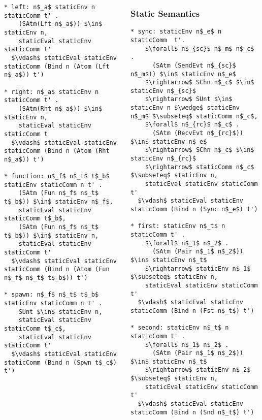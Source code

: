\documentclass{beamer}
\begin{document}
\begin{frame}[fragile]
\begin{columns}
\begin{frame}[fragile]
\begin{lstlisting}[language=logic, mathescape]
* left: n$_a$ staticEnv n staticComm t' .
    (SAtm(Lft n$_a$)) $\in$ staticEnv n,
    staticEval staticEnv staticComm t' 
  $\vdash$ staticEval staticEnv staticComm (Bind n (Atom (Lft n$_a$)) t')

* right: n$_a$ staticEnv n staticComm t' .
    (SAtm(Rht n$_a$)) $\in$ staticEnv n, 
    staticEval staticEnv staticComm t
  $\vdash$ staticEval staticEnv staticComm (Bind n (Atom (Rht n$_a$)) t')

* function: n$_f$ n$_t$ t$_b$ staticEnv staticComm n t' .
    (SAtm (Fun n$_f$ n$_t$ t$_b$)) $\in$ staticEnv n$_f$, 
    staticEval staticEnv staticComm t$_b$, 
    (SAtm (Fun n$_f$ n$_t$ t$_b$)) $\in$ staticEnv n, 
    staticEval staticEnv staticComm t'
  $\vdash$ staticEval staticEnv staticComm (Bind n (Atom (Fun n$_f$ n$_t$ t$_b$)) t')

* spawn: n$_f$ n$_t$ t$_b$ staticEnv staticComm n t' .
    SUnt $\in$ staticEnv n, 
    staticEval staticEnv staticComm t$_c$, 
    staticEval staticEnv staticComm t'
  $\vdash$ staticEval staticEnv staticComm (Bind n (Spwn t$_c$) t')
\end{lstlisting}
\end{frame}

\begin{frame}[fragile]
	\frametitle{Static Semantics}
\begin{lstlisting}[language=logic, mathescape]
* sync: staticEnv n$_e$ n staticComm  t'.
    $\forall$ n$_{sc}$ n$_m$ n$_c$ . 
      (SAtm (SendEvt n$_{sc}$ n$_m$)) $\in$ staticEnv n$_e$
    $\rightarrow$ SChn n$_c$ $\in$ staticEnv n$_{sc}$ 
    $\rightarrow$ SUnt $\in$ staticEnv n $\wedge$ staticEnv n$_m$ $\subseteq$ staticComm n$_c$,
    $\forall$ n$_{rc}$ n$_c$ . 
      (SAtm (RecvEvt n$_{rc}$)) $\in$ staticEnv n$_e$
    $\rightarrow$ SChn n$_c$ $\in$ staticEnv n$_{rc}$ 
    $\rightarrow$ staticComm n$_c$ $\subseteq$ staticEnv n,
    staticEval staticEnv staticComm t'
  $\vdash$ staticEval staticEnv staticComm (Bind n (Sync n$_e$) t')

* first: staticEnv n$_t$ n staticComm t' . 
    $\forall$ n$_1$ n$_2$ .
      (SAtm (Pair n$_1$ n$_2$)) $\in$ staticEnv n$_t$
    $\rightarrow$ staticEnv n$_1$ $\subseteq$ staticEnv n,
    staticEval staticEnv staticComm t'
  $\vdash$ staticEval staticEnv staticComm (Bind n (Fst n$_t$) t')

* second: staticEnv n$_t$ n staticComm t' . 
    $\forall$ n$_1$ n$_2$ . 
      (SAtm (Pair n$_1$ n$_2$)) $\in$ staticEnv n$_t$
    $\rightarrow$ staticEnv n$_2$ $\subseteq$ staticEnv n,
    staticEval staticEnv staticComm t'
  $\vdash$ staticEval staticEnv staticComm (Bind n (Snd n$_t$) t')


\end{lstlisting}
\end{frame}
\end{columns}
\end{frame}
\end{document}
